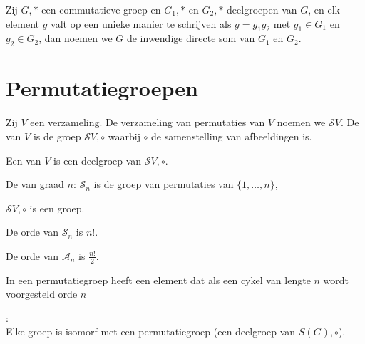 \documentclass[main.tex]{subfiles}
\begin{document}
\begin{de}
  Zij $G,*$ een commutatieve groep en $G_{1},*$ en $G_{2},*$ deelgroepen van $G$, en elk element $g$ valt op een unieke manier te schrijven als $g=g_{1}g_{2}$ met $g_{1}\in G_{1}$ en $g_{2}\in G_{2}$, dan noemen we $G$ de inwendige directe som van $G_{1}$ en $G_{2}$.
\end{de}

\section{Permutatiegroepen}
\label{sec:permutatiegroepen}

\begin{de}
  Zij $V$ een verzameling.
  De verzameling van permutaties van $V$ noemen we $\mathcal{S}V$.
  De  van $V$ is de groep $\mathcal{S}V, \circ$ waarbij $\circ$ de samenstelling van afbeeldingen is.
\end{de}

\begin{de}
  Een  van $V$ is een deelgroep van $\mathcal{S}V,\circ$.
\end{de}

\begin{de}
  De  van graad $n$: $\mathcal{S}_{n}$ is de groep van permutaties van $\{1,\dotsc,n\}$,
\end{de}

\begin{st}
  $\mathcal{S}V,\circ$ is een groep.

\end{st}

\begin{st}
  De orde van $\mathcal{S}_{n}$ is $n!$.

\end{st}

\begin{st}
  De orde van $\mathcal{A}_{n}$ is $\frac{n!}{2}$.

\end{st}

\begin{st}
  In een permutatiegroep heeft een element dat als een cykel van lengte $n$ wordt voorgesteld orde $n$

\end{st}

\begin{st}
  \label{st:stelling-van-cayley}
  :\\
  Elke groep is isomorf met een permutatiegroep (een deelgroep van $S(G),\circ$).

\end{st}
\end{document}
